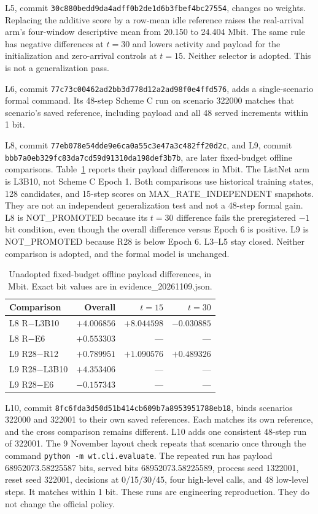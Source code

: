 L5, commit \nolinkurl{30c880bedd9da4adff0b2de1d6b3fbef4bc27554}, changes no weights. Replacing the additive score by a row-mean idle reference raises the real-arrival arm's four-window descriptive mean from 20.150 to 24.404 Mbit. The same rule has negative differences at $t=30$ and lowers activity and payload for the initialization and zero-arrival controls at $t=15$. Neither selector is adopted. This is not a generalization pass.

L6, commit \nolinkurl{77c73c00462ad2bb3d778d12a2ad98f0e4ffd576}, adds a single-scenario formal command. Its 48-step Scheme C run on scenario 322000 matches that scenario's saved reference, including payload and all 48 served increments within 1 bit.

L8, commit \nolinkurl{77eb078e54dde9e6ca0a55c3e47a3c482ff20d2c}, and L9, commit \nolinkurl{bbb7a0eb329fc83da7cd59d91310da198def3b7b}, are later fixed-budget offline comparisons. Table~\ref{tab:l8l9} reports their payload differences in Mbit. The ListNet arm is L3B10, not Scheme C Epoch 1. Both comparisons use historical training states, 128 candidates, and 15-step scores on MAX\_RATE\_INDEPENDENT snapshots. They are not an independent generalization test and not a 48-step formal gain. L8 is NOT\_PROMOTED because its $t{=}30$ difference fails the preregistered $-1$ bit condition, even though the overall difference versus Epoch 6 is positive. L9 is NOT\_PROMOTED because R28 is below Epoch 6. L3--L5 stay closed. Neither comparison is adopted, and the formal model is unchanged.

\begin{table}[t]
\caption{Unadopted fixed-budget offline payload differences, in Mbit. Exact bit values are in evidence\_20261109.json.}
\label{tab:l8l9}
\centering
\footnotesize
\begin{tabular}{@{}lrrr@{}}
\toprule
Comparison & Overall & $t{=}15$ & $t{=}30$ \\
\midrule
L8 R$-$L3B10 & $+4.006856$ & $+8.044598$ & $-0.030885$ \\
L8 R$-$E6 & $+0.553303$ & --- & --- \\
L9 R28$-$R12 & $+0.789951$ & $+1.090576$ & $+0.489326$ \\
L9 R28$-$L3B10 & $+4.353406$ & --- & --- \\
L9 R28$-$E6 & $-0.157343$ & --- & --- \\
\bottomrule
\end{tabular}
\end{table}

L10, commit \nolinkurl{8fc6fda3d50d51b414cb609b7a8953951788eb18}, binds scenarios 322000 and 322001 to their own saved references. Each matches its own reference, and the cross comparison remains different. L10 adds one consistent 48-step run of 322001. The 9 November layout check repeats that scenario once through the command \nolinkurl{python -m wt.cli.evaluate}. The repeated run has payload 68952073.58225587 bits, served bits 68952073.58225589, process seed 1322001, reset seed 322001, decisions at 0/15/30/45, four high-level calls, and 48 low-level steps. It matches within 1 bit. These runs are engineering reproduction. They do not change the official policy.

